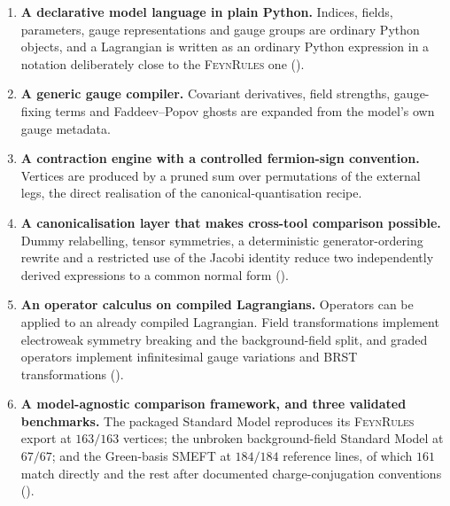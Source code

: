 \begin{enumerate}
    \item \textbf{A declarative model language in plain Python.} Indices,
    fields, parameters, gauge representations and gauge groups are ordinary
    Python objects, and a Lagrangian is written as an ordinary Python
    expression in a notation deliberately close to the
    \textsc{FeynRules} one
    ().

    \item \textbf{A generic gauge compiler.} Covariant derivatives, field
    strengths, gauge-fixing terms and Faddeev--Popov ghosts are expanded
    from the model's own gauge metadata.

    \item \textbf{A contraction engine with a controlled fermion-sign
    convention.} Vertices are produced by a pruned sum over permutations of
    the external legs, the direct realisation of the canonical-quantisation
    recipe.

    \item \textbf{A canonicalisation layer that makes cross-tool comparison
    possible.} Dummy relabelling, tensor symmetries, a deterministic
    generator-ordering rewrite and a restricted use of the Jacobi identity
    reduce two independently derived expressions to a common normal form
    (). 

    \item \textbf{An operator calculus on compiled Lagrangians.} Operators
    can be applied to an already compiled Lagrangian. Field
    transformations implement electroweak symmetry breaking and the
    background-field split, and graded operators implement infinitesimal
    gauge variations and BRST transformations
    ().

    \item \textbf{A model-agnostic comparison framework, and three validated
    benchmarks.} The packaged Standard Model reproduces its
    \textsc{FeynRules} export at $163/163$ vertices; the unbroken
    background-field Standard Model at $67/67$; and the Green-basis SMEFT at
    $184/184$ reference lines, of which $161$ match directly and the rest
    after documented charge-conjugation conventions ().
\end{enumerate}

